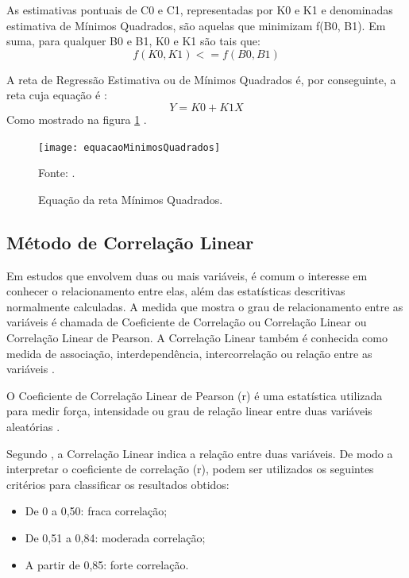 As estimativas pontuais de C0 e C1, representadas por K0 e K1 e denominadas estimativa de Mínimos Quadrados, são aquelas que minimizam f(B0, B1). Em suma,  para qualquer B0 e B1, K0 e K1 são tais que:
\begin{equation}
f(K0,K1) <= f(B0,B1)
\end{equation}

A reta de Regressão Estimativa ou de Mínimos Quadrados é, por conseguinte, a reta cuja equação é :
\begin{equation}
Y = K0 + K1X 
\end{equation}
Como mostrado na figura \ref{equacaoMinimos} \cite[pág.~441]{devore2006}.

\graphicspath{{figuras/}}
\begin{figure}[htp]
\centering
\texttt{[image: equacaoMinimosQuadrados]}
\caption{Equação da reta Mínimos Quadrados.}{Fonte: .} 
\label{equacaoMinimos}
\end{figure}

\subsection{Método de Correlação Linear}

Em estudos que envolvem duas ou mais variáveis, é comum o interesse em conhecer o relacionamento entre elas, além das estatísticas descritivas normalmente calculadas. A medida que mostra o grau de relacionamento entre as variáveis é chamada de Coeficiente de Correlação ou Correlação Linear ou Correlação Linear de Pearson. A Correlação Linear também é conhecida como medida de associação, interdependência, intercorrelação ou relação entre as variáveis \cite[pág.~62]{lira2004}.

O Coeficiente de Correlação Linear de Pearson (r) é uma estatística utilizada para medir força, intensidade ou grau de relação linear entre duas variáveis aleatórias \cite[pág.~664]{ferreira2009}.

Segundo , a Correlação Linear indica a relação entre duas variáveis. De modo a interpretar o coeficiente de correlação (r), podem ser utilizados os seguintes critérios para classificar os resultados obtidos:

\begin{itemize}
\item De 0 a 0,50: fraca correlação; 
\item De 0,51 a 0,84: moderada correlação;
\item A partir de 0,85: forte correlação.
\end{itemize}

